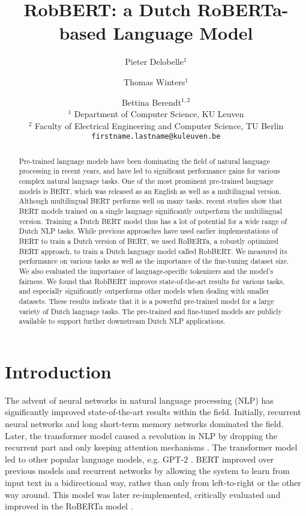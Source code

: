 \documentclass[11pt,a4paper]{article}
\title{RobBERT: a Dutch RoBERTa-based Language Model}
\author{Pieter Delobelle$^1$ \and Thomas Winters$^1$ \and Bettina Berendt$^{1,2}$\\
$^1$ Department of Computer Science, KU Leuven \\
$^2$ Faculty of Electrical Engineering and Computer Science, TU Berlin \\
\texttt{firstname.lastname@kuleuven.be}}
\date{}
\begin{document}
\maketitle
\begin{abstract}
Pre-trained language models have been dominating the field of natural language processing in recent years, and have led to significant performance gains for various complex natural language tasks.
One of the most prominent pre-trained language models is BERT, which was released as an English as well as a multilingual version.
Although multilingual BERT performs well on many tasks, recent studies show that BERT models trained on a single language significantly outperform the multilingual version.
Training a Dutch BERT model thus has a lot of potential for a wide range of Dutch NLP tasks.
While previous approaches have used earlier implementations of BERT to train a Dutch version of BERT, we used RoBERTa, a robustly optimized BERT approach, to train a Dutch language model called RobBERT.
We measured its performance on various tasks as well as the importance of the fine-tuning dataset size.
We also evaluated the importance of language-specific tokenizers and the model's fairness.
We found that RobBERT improves state-of-the-art results for various tasks, and especially significantly outperforms other models when dealing with smaller datasets.
These results indicate that it is a powerful pre-trained model for a large variety of Dutch language tasks.
The pre-trained and fine-tuned models are publicly available to support further downstream Dutch NLP applications.
\end{abstract}

\section{Introduction}

The advent of neural networks in natural language processing (NLP) has significantly improved state-of-the-art results within the field.
Initially, recurrent neural networks and long short-term memory networks dominated the field.
Later, the transformer model caused a revolution in NLP by dropping the recurrent part and only keeping attention mechanisms \citep{vaswaniAttention2017}.
The transformer model led to other popular language models, e.g. GPT-2 \citep{radford2018gpt,radford2019gpt2}.
BERT \citep{devlinBERT2019a} improved over previous models and recurrent networks by allowing the system to learn from input text in a bidirectional way, rather than only from left-to-right or the other way around.
This model was later re-implemented, critically evaluated and improved in the RoBERTa model \citep{liuRoBERTa2019}.
\end{document}
